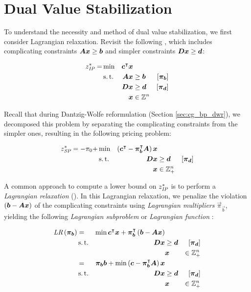 \section{Dual Value Stabilization}\label{sec:cg_bp_dvs}
To understand the necessity and method of dual value stabilization, we first consider Lagrangian relaxation. Revisit the following \IP{}, which includes complicating constraints ${\bm{A}} {\bm{x}} \geq {\bm{b}}$ and simpler constraints ${\bm{D}} {\bm{x}} \geq {\bm{d}}$:

\begin{equation*}
\begin{aligned}
z^*_{\textit{IP}}{} = &\min & {\bm{c}}^\intercal {\bm{x}} & & & \\
&\operatorname{s.t.} & {\bm{A}} {\bm{x}} & \geq {\bm{b}} & \left[{\bm{\pi}}_{\bm{b}}\right] & \\
&& {\bm{D}} {\bm{x}} & \geq {\bm{d}} & \left[{\bm{\pi}}_{\bm{d}}\right] & \\
&& {\bm{x}} & \in \mathbb{Z}^n
\end{aligned}
\end{equation*}

Recall that during Dantzig-Wolfe reformulation (Section \ref{sec:cg_bp_dwr}), we decomposed this problem by separating the complicating constraints from the simpler ones, resulting in the following pricing problem:

\begin{equation*}
\begin{aligned}
z^*_\SP{} = -\pi_0 + &\min & \left( \vec{c}\transpose - \vec{\pi}_\vec{b}\transpose \mat{A} \right) \vec{x} & & \\
&\st & \mat{D} \vec{x} & \geq \vec{d} & \left[\vec{\pi}_\vec{d}\right] \\
&& \vec{x} & \in \mathbb{Z}_+^n
\end{aligned}
\end{equation*}

A common approach to compute a lower bound on $z^*_{\textit{IP}}{}$ is to perform a \textit{Lagrangian relaxation} (\LR{}). In this Lagrangian relaxation, we penalize the violation $({\bm{b}} - {\bm{A}} {\bm{x}})$ of the complicating constraints using \textit{Lagrangian multipliers} $\vec{\pi}_\vec{b}$, yielding the following \textit{Lagrangian subproblem} or \textit{Lagrangian function} \cite{thebook}:

\begin{equation*}
\begin{aligned}
\LR{\vec{\pi}_\vec{b}} &= & \min \vec{c}\transpose \vec{x} + \vec{\pi}_\vec{b}\transpose \left( \vec{b} - \mat{A}\vec{x} \right) & & \\
& \st & \mat{D} \vec{x} & \geq \vec{d} & \left[\vec{\pi}_\vec{d}\right] \\
&&& \vec{x} & \in \mathbb{Z}_+^n \\
&= & \vec{\pi}_\vec{b} \vec{b} + \min \left( \vec{c} - \vec{\pi}_\vec{b}\transpose \mat{A} \right) \vec{x} & & \\
& \st & \mat{D} \vec{x} & \geq \vec{d} & \left[\vec{\pi}_\vec{d}\right] \\
&&& \vec{x} & \in \mathbb{Z}_+^n
\end{aligned}
\end{equation*}

